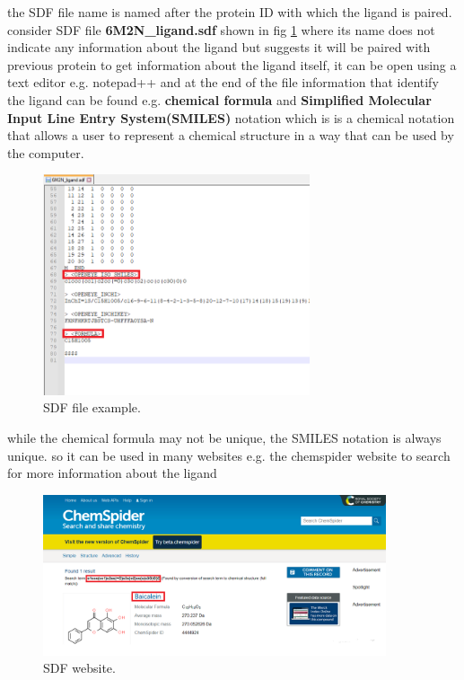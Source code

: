 \documentclass[11pt, a4paper]{article}
\begin{document}
        the SDF file name is named after the protein ID with which the ligand is paired. consider SDF file \textbf{6M2N\_ligand.sdf} shown in fig \ref{fig 5} where its name does not indicate any information about the ligand but suggests it will be paired with previous protein
        to get information about the ligand itself, it can be open using a text editor e.g. notepad++ and at the end of the file information that identify the ligand can be found e.g. \textbf{chemical formula} and \textbf{Simplified Molecular Input Line Entry System(SMILES)} notation which is is a chemical notation that allows a user to represent a chemical structure in a way that can be used by the computer.
        
        \begin{figure}[H]
            \centering
            \includegraphics[width=0.7\textwidth]{sdf file.PNG} %
            \caption{SDF file example.}
            \label{fig 5}
        \end{figure}

        while the chemical formula may not be unique, the SMILES notation is always unique. so it can be used in many websites e.g. the chemspider website\cite{6}  to search for more information about the ligand

        \begin{figure}[H]
            \centering
            \includegraphics[width=0.9\textwidth]{sdf website.PNG} %
            \caption{SDF website.}
            \label{fig 6}
        \end{figure}
\end{document}
